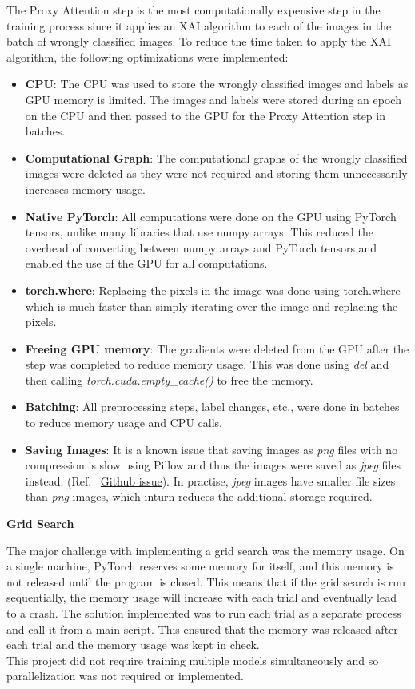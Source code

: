 The Proxy Attention step is the most computationally expensive step in the training process since it applies an XAI algorithm to each of the images in the batch of wrongly classified images. To reduce the time taken to apply the XAI algorithm, the following optimizations were implemented:
\begin{itemize}
    \item \textbf{CPU}: The CPU was used to store the wrongly classified images and labels as GPU memory is limited. The images and labels were stored during an epoch on the CPU and then passed to the GPU for the Proxy Attention step in batches.
    \item \textbf{Computational Graph}: The computational graphs of the wrongly classified images were deleted as they were not required and storing them unnecessarily increases memory usage.
    \item \textbf{Native PyTorch}: All computations were done on the GPU using PyTorch tensors, unlike many libraries that use numpy arrays. This reduced the overhead of converting between numpy arrays and PyTorch tensors and enabled the use of the GPU for all computations.
    \item \textbf{torch.where}: Replacing the pixels in the image was done using torch.where which is much faster than simply iterating over the image and replacing the pixels.
    \item \textbf{Freeing GPU memory}: The gradients were deleted from the GPU after the step was completed to reduce memory usage. This was done using \textit{del} and then calling \textit{torch.cuda.empty\_cache()} to free the memory.
    \item \textbf{Batching}: All preprocessing steps, label changes, etc., were done in batches to reduce memory usage and CPU calls.
    \item \textbf{Saving Images}: It is a known issue that saving images as \textit{png} files with no compression is slow using Pillow and thus the images were saved as \textit{jpeg} files instead. (Ref. ~\href{https://github.com/python-pillow/Pillow/issues/1211}{Github issue}). In practise, \textit{jpeg} images have smaller file sizes than \textit{png} images, which inturn reduces the additional storage required.

\end{itemize}

\textbf{Grid Search}

The major challenge with implementing a grid search was the memory usage. On a single machine, PyTorch reserves some memory for itself, and this memory is not released until the program is closed. This means that if the grid search is run sequentially, the memory usage will increase with each trial and eventually lead to a crash. The solution implemented was to run each trial as a separate process and call it from a main script. This ensured that the memory was released after each trial and the memory usage was kept in check.\\
This project did not require training multiple models simultaneously and so parallelization was not required or implemented.

